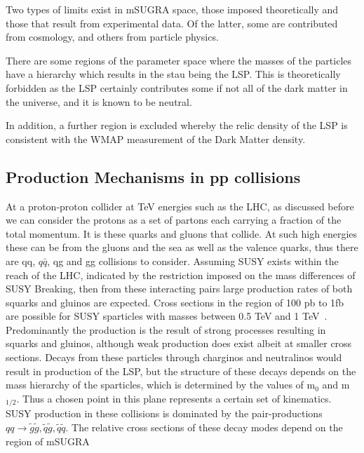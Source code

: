 Two types of limits exist in mSUGRA space, those imposed theoretically and those that result from experimental data. Of the latter, some are contributed from cosmology, and others from particle physics. 

There are some regions of the parameter space where the masses of the particles have a hierarchy which results in the stau being the LSP. This is theoretically forbidden as the LSP certainly contributes some if not all of the dark matter in the universe, and it is known to be neutral. 

In addition, a further region is excluded whereby the relic density of the LSP is consistent with the WMAP measurement of the Dark Matter density. 

\subsection{Production Mechanisms in pp collisions}
At a proton-proton collider at TeV energies such as the LHC, as discussed before we can consider the protons as a set of partons each carrying a fraction of the total momentum. It is these quarks and gluons that collide. At such high energies these can be from the gluons and the sea as well as the valence quarks, thus there are qq, $q\bar{q}$, qg and gg collisions to consider.
Assuming SUSY exists within the reach of the LHC, indicated by the restriction imposed on the mass differences of SUSY Breaking, then from these interacting pairs large production rates of both squarks and gluinos are expected. Cross sections in the region of 100 pb to 1fb are possible for SUSY sparticles with masses between 0.5 TeV and 1 TeV~\cite{early}. Predominantly the production is the result of strong processes resulting in squarks and gluinos, although weak production does exist albeit at smaller cross sections. Decays from these particles through charginos and neutralinos would result in production of the LSP, but the structure of these decays depends on the mass hierarchy of the sparticles, which is determined by the values of m$_{0}$ and m$_{1/2}$.  Thus a chosen point in this plane represents a certain set of kinematics. SUSY production in these collisions is dominated by the pair-productions $ qq \rightarrow \tilde{g} \tilde{g}, \tilde{q}\tilde{g}, \tilde{q} \tilde{q}$. The relative cross sections of these decay modes depend on the region of mSUGRA 

